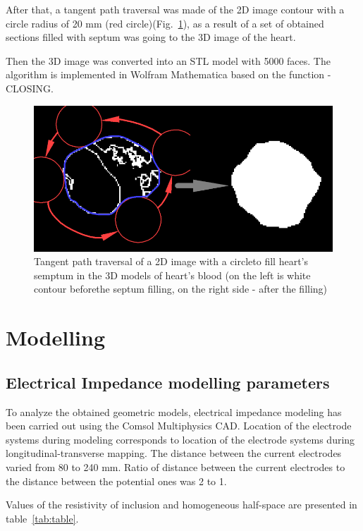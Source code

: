 \documentclass[conference]{IEEEtran}
\begin{document}
After that, a tangent path traversal was made of the 2D image contour with a circle radius of 20 mm (red circle)(Fig.~\ref{fig:algo2}), as a result of a set of obtained sections filled with septum was going to the 3D image of the heart.

Then the 3D image was converted into an STL model with 5000 faces.
The algorithm is implemented in Wolfram Mathematica based on the function - CLOSING.

\begin{figure}[tbph]
    \centering
    \includegraphics[width=0.9\linewidth]{fig/algo2}
    \caption{Tangent path traversal of a 2D image with a circleto fill heart's semptum
    in the 3D models of heart's blood (on the left is white contour beforethe septum filling,
        on the right side - after the filling)}
    \label{fig:algo2}
\end{figure}

\section{Modelling}
\subsection{Electrical Impedance modelling parameters}

To analyze the obtained geometric models, electrical impedance modeling has been carried out using the Comsol Multiphysics CAD.
Location of the electrode systems during modeling corresponds to location of the electrode systems during longitudinal-transverse mapping.
The distance between the current electrodes varied from 80 to 240 mm.
Ratio of distance between the current electrodes to the distance between the potential ones was 2 to 1.

Values of the resistivity of inclusion and homogeneous half-space are presented in table~\ref{tab:table}.
\end{document}
